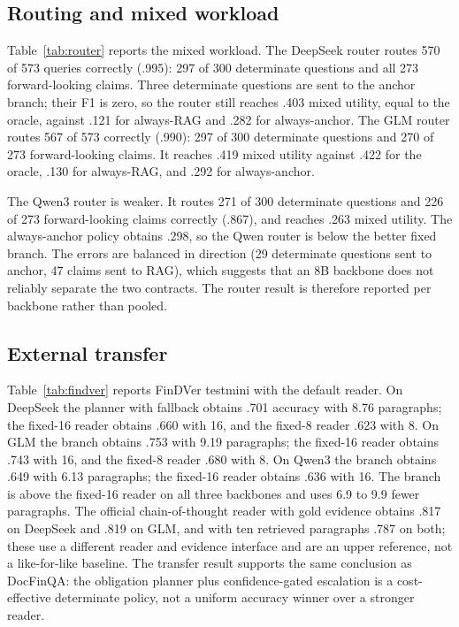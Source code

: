 \documentclass[11pt]{article}
\begin{document}


\subsection{Routing and mixed workload}
Table~\ref{tab:router} reports the mixed workload. The DeepSeek router routes 570 of 573 queries correctly (.995): 297 of 300 determinate questions and all 273 forward-looking claims. Three determinate questions are sent to the anchor branch; their F1 is zero, so the router still reaches .403 mixed utility, equal to the oracle, against .121 for always-RAG and .282 for always-anchor. The GLM router routes 567 of 573 correctly (.990): 297 of 300 determinate questions and 270 of 273 forward-looking claims. It reaches .419 mixed utility against .422 for the oracle, .130 for always-RAG, and .292 for always-anchor.

The Qwen3 router is weaker. It routes 271 of 300 determinate questions and 226 of 273 forward-looking claims correctly (.867), and reaches .263 mixed utility. The always-anchor policy obtains .298, so the Qwen router is below the better fixed branch. The errors are balanced in direction (29 determinate questions sent to anchor, 47 claims sent to RAG), which suggests that an 8B backbone does not reliably separate the two contracts. The router result is therefore reported per backbone rather than pooled.



\subsection{External transfer}
Table~\ref{tab:findver} reports FinDVer testmini with the default reader. On DeepSeek the planner with fallback obtains .701 accuracy with 8.76 paragraphs; the fixed-16 reader obtains .660 with 16, and the fixed-8 reader .623 with 8. On GLM the branch obtains .753 with 9.19 paragraphs; the fixed-16 reader obtains .743 with 16, and the fixed-8 reader .680 with 8. On Qwen3 the branch obtains .649 with 6.13 paragraphs; the fixed-16 reader obtains .636 with 16. The branch is above the fixed-16 reader on all three backbones and uses 6.9 to 9.9 fewer paragraphs. The official chain-of-thought reader with gold evidence obtains .817 on DeepSeek and .819 on GLM, and with ten retrieved paragraphs .787 on both; these use a different reader and evidence interface and are an upper reference, not a like-for-like baseline. The transfer result supports the same conclusion as DocFinQA: the obligation planner plus confidence-gated escalation is a cost-effective determinate policy, not a uniform accuracy winner over a stronger reader.
\end{document}
